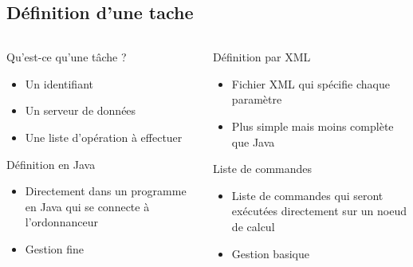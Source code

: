 \documentclass{beamer}
\begin{document}
\subsection{Définition d'une tache}
\begin{frame}
	\begin{columns}
	\begin{column}[l]{0.5\linewidth}
        \begin{block}{Qu'est-ce qu'une t\^ache ?}
            \begin{itemize}
                \item Un identifiant
                \item Un serveur de données
                \item Une liste d'opération à effectuer %
            \end{itemize}
        \end{block}
        \begin{exampleblock}{Définition en Java}
            \begin{itemize}
                \item Directement dans un programme en Java qui se connecte à l'ordonnanceur
                \item Gestion fine
            \end{itemize}
        \end{exampleblock}
	\end{column}
	\begin{column}[r]{0.5\linewidth}
        \begin{exampleblock}{Définition par XML}
            \begin{itemize}
                \item Fichier XML qui spécifie chaque paramètre
                \item Plus simple mais moins complète que Java
            \end{itemize}
        \end{exampleblock}
        \begin{exampleblock}{Liste de commandes}%
            \begin{itemize}
                \item Liste de commandes qui seront exécutées directement sur un noeud de calcul
                \item Gestion basique
            \end{itemize}
        \end{exampleblock}
	\end{column}
	\end{columns}
\end{frame}
\end{document}
